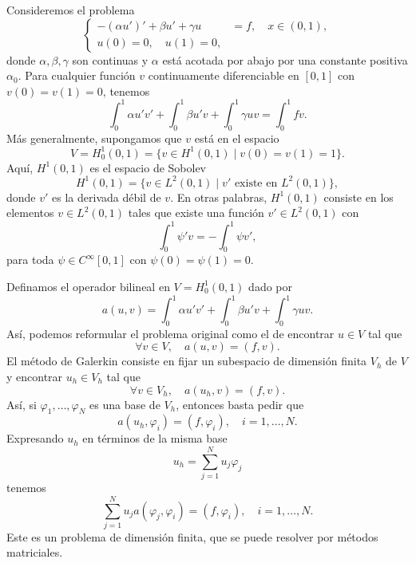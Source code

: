 \documentclass[11pt,letterpaper]{report}
\renewcommand\phi\varphi
\begin{document}
Consideremos el problema
\begin{equation}
  \left\{
    \begin{aligned}
      -(\alpha u')' + \beta u' + \gamma u &= f, \quad x\in (0,1),
      \\
      u(0) = 0, \quad u(1) = 0, &
    \end{aligned}
  \right.
\end{equation}
donde $\alpha,\beta,\gamma$ son continuas y $\alpha$ está acotada por
abajo por una constante positiva $\alpha_0$.
Para cualquier función $v$ continuamente diferenciable en $[0,1]$ con
$v(0)=v(1)=0$, tenemos
\begin{equation}
       \int_0^{1} \alpha u'v' + \int_0^{1} \beta u'v + \int_0^{1} \gamma u v
      = \int_0^{1} fv
.\end{equation}
Más generalmente, supongamos que $v$ está en el espacio
\begin{equation}
  V
  = H^{1}_0(0,1)
  = \{ v \in H^{1}(0,1) \mid v(0)=v(1)=1 \}.
\end{equation}
Aquí, $H^{1}(0,1)$ es el espacio de Sobolev
\begin{equation}
  H^{1}(0,1)
  =
  \{v\in L^{2}(0,1) \mid v' \text{ existe en } L^{2}(0,1) \}
,\end{equation}
donde $v'$ es la derivada débil de $v$. En otras palabras,
$H^{1}(0,1)$ consiste en los elementos $v\in L^{2}(0,1)$ tales que
existe una función $v'\in L^{2}(0,1)$ con
\begin{equation}
    \int_{0}^{1} \psi' v
    =
    - \int_{0}^{1} \psi v'
,\end{equation}
para toda $\psi\in C^{\infty}[0,1]$ con $\psi(0)=\psi(1)=0$.

Definamos el operador bilineal en $V=H^{1}_0(0,1)$ dado por
\begin{equation}
  a(u,v)
  = 
  \int_0^{1} \alpha u'v' + \int_0^{1} \beta u'v + \int_0^{1} \gamma u v
.\end{equation}
Así, podemos reformular el problema original como el de encontrar
$u\in V$ tal que
\begin{equation}
  \forall v\in V,\quad a(u,v) = (f,v)
.\end{equation}
El método de Galerkin consiste en fijar un subespacio de dimensión
finita $V_h$ de $V$ y encontrar $u_h\in V_h$ tal que
\begin{equation}
  \forall v\in V_h, \quad a(u_h,v) = (f,v)
.\end{equation}
Así, si $\phi_1,\dots,\phi_N$ es una base de $V_h$, entonces basta
pedir que
\begin{equation}
  a(u_h,\phi_i) = (f,\phi_i), \quad i=1,\dots,N
.\end{equation}
Expresando $u_h$ en términos de la misma base
\begin{equation}
  u_h = \sum_{j=1}^{N}u_j\phi_j
\end{equation}
tenemos
\begin{equation}
  \sum_{j=1}^{N} u_j a(\phi_j,\phi_i) = (f,\phi_i), \quad i=1,\dots,N
.\end{equation}
Este es un problema de dimensión finita, que se puede resolver por
métodos matriciales.
\end{document}
